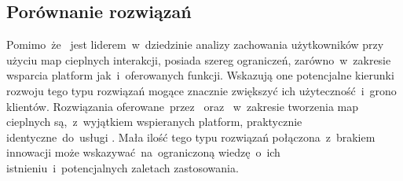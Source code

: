 \subsection{Porównanie rozwiązań}
Pomimo~że~ jest liderem~w~dziedzinie analizy zachowania użytkowników przy użyciu map cieplnych interakcji, posiada szereg ograniczeń, zarówno~w~zakresie wsparcia platform jak~i~oferowanych funkcji. Wskazują one potencjalne kierunki rozwoju tego typu rozwiązań mogące znacznie zwiększyć ich użyteczność~i~grono klientów. Rozwiązania oferowane~przez~ oraz ~w~zakresie tworzenia map cieplnych są,~z~wyjątkiem wspieranych platform, praktycznie identyczne~do~usługi .  Mała ilość tego typu rozwiązań połączona~z~brakiem innowacji może wskazywać~na~ograniczoną wiedzę~o~ich istnieniu~i~potencjalnych zaletach zastosowania.
